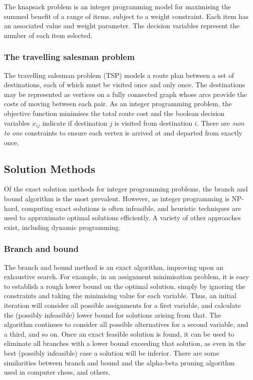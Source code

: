 \documentclass[11pt]{amsart}
\begin{document}
The knapsack problem is an integer programming model for maximising the summed benefit of a range of items, subject to a weight constraint. Each item has an associated value and weight parameter. The decision variables represent the number of each item selected.

\subsubsection{The travelling salesman problem}

The travelling salesman problem (TSP) models a route plan between a set of destinations, each of which must be visited once and only once. The destinations may be represented as vertices on a fully connected graph whose arcs provide the costs of moving between each pair. As an integer programming problem, the objective function minimises the total route cost and the boolean decision variables $x_{ij}$ indicate if destination $j$ is visited from destination $i$. There are \emph{sum to one} constraints to ensure each vertex is arrived at and departed from exactly once.

\subsection{Solution Methods}

Of the exact solution methods for integer programming problems, the branch and bound algorithm is the most prevalent. However, as integer programming is NP-hard, computing exact solutions is often infeasible, and heuristic techniques are used to approximate optimal solutions efficiently. A variety of other approaches exist, including dynamic programming.

\subsubsection{Branch and bound}

The branch and bound method is an exact algorithm, improving upon an exhaustive search. For example, in an assignment minimisation problem, it is easy to establish a rough lower bound on the optimal solution, simply by ignoring the constraints and taking the minimising value for each variable. Thus, an initial iteration will consider all possible assignments for a first variable, and calculate the (possibly infeasible) lower bound for solutions arising from that. The algorithm continues to consider all possible alternatives for a second variable, and a third, and so on. Once an exact feasible solution is found, it can be used to eliminate all branches with a lower bound exceeding that solution, as even in the best (possibly infeasible) case a solution will be inferior. There are some similarities between branch and bound and the alpha-beta pruning algorithm used in computer chess, and others.
\end{document}
